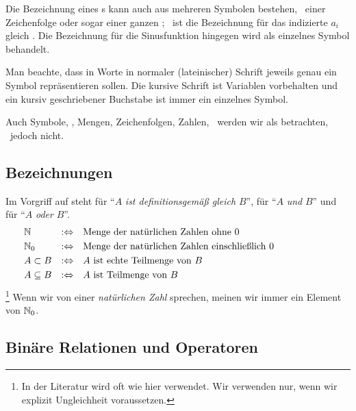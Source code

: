 Die Bezeichnung eines s kann auch aus mehreren Symbolen bestehen, \textdh\ einer Zeichenfolge oder sogar einer ganzen ; \textzB\ ist die Bezeichnung für das indizierte  $a_i$ gleich .
Die Bezeichnung für die Sinusfunktion hingegen wird als einzelnes Symbol behandelt.

Man beachte, dass in  Worte in normaler (lateinischer) Schrift jeweils genau ein Symbol repräsentieren sollen.
Die kursive Schrift ist Variablen vorbehalten und ein kursiv geschriebener Buchstabe ist immer ein einzelnes Symbol.

Auch Symbole, , Mengen, Zeichenfolgen, Zahlen, \textusw\ werden wir als  betrachten,  \textiAlg\ jedoch nicht.

\subsection{Bezeichnungen}%
\label{sub:Bezeichnungen}

Im Vorgriff auf  steht  für \enquote{$A$ \emph{ist definitionsgemäß gleich} $B$},  für \enquote{$A$ \emph{und} $B$} und  für \enquote{$A$ \emph{oder} $B$}.
\begin{align}
	& \mathbb{N}          & :\Leftrightarrow & \quad
	\text{Menge der natürlichen Zahlen ohne           $0$} \\
	& \mathbb{N}_0         & :\Leftrightarrow & \quad
	\text{Menge der natürlichen Zahlen einschließlich $0$} \\
	& A \subset B   & :\Leftrightarrow & \quad
	\text{$A$ ist echte Teilmenge von $B$}                 \\
	& A \subseteq B & :\Leftrightarrow & \quad
	\text{$A$ ist       Teilmenge von $B$}                 &&&&&&&&&&
\end{align}%
\footnote{%
	In der Literatur wird \chrqt{$\subset$} oft wie hier \chrqt{$\subseteq$} verwendet.
	Wir verwenden \chrqt{$\subset$} nur, wenn wir explizit Ungleichheit voraussetzen.
}
Wenn wir von einer \emph{natürlichen Zahl} sprechen, meinen wir immer ein Element von $\mathbb{N}_0$.

\subsection{Binäre Relationen und Operatoren}%
\label{sub:binär}

